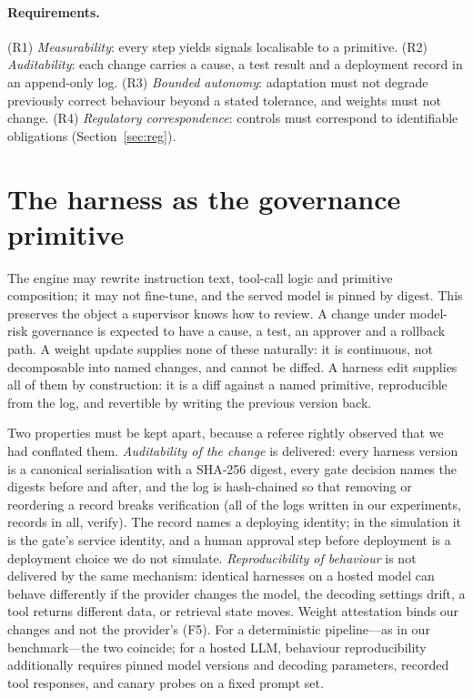 \documentclass[11pt]{article}
\begin{document}
\paragraph{Requirements.} (R1) \emph{Measurability}: every step yields signals localisable to a primitive. (R2) \emph{Auditability}: each change carries a cause, a test result and a deployment record in an append-only log. (R3) \emph{Bounded autonomy}: adaptation must not degrade previously correct behaviour beyond a stated tolerance, and weights must not change. (R4) \emph{Regulatory correspondence}: controls must correspond to identifiable obligations (Section~\ref{sec:reg}).

\section{The harness as the governance primitive}
\label{sec:harness}

The engine may rewrite instruction text, tool-call logic and primitive composition; it may not fine-tune, and the served model is pinned by digest. This preserves the object a supervisor knows how to review. A change under model-risk governance is expected to have a cause, a test, an approver and a rollback path. A weight update supplies none of these naturally: it is continuous, not decomposable into named changes, and cannot be diffed. A harness edit supplies all of them by construction: it is a diff against a named primitive, reproducible from the log, and revertible by writing the previous version back.

Two properties must be kept apart, because a referee rightly observed that we had conflated them. \emph{Auditability of the change} is delivered: every harness version is a canonical serialisation with a SHA-256 digest, every gate decision names the digests before and after, and the log is hash-chained so that removing or reordering a record breaks verification (all \nlogsok{} of the \nlogs{} logs written in our experiments, \nrecords{} records in all, verify). The record names a deploying identity; in the simulation it is the gate's service identity, and a human approval step before deployment is a deployment choice we do not simulate. \emph{Reproducibility of behaviour} is not delivered by the same mechanism: identical harnesses on a hosted model can behave differently if the provider changes the model, the decoding settings drift, a tool returns different data, or retrieval state moves. Weight attestation binds our changes and not the provider's (F5). For a deterministic pipeline---as in our benchmark---the two coincide; for a hosted LLM, behaviour reproducibility additionally requires pinned model versions and decoding parameters, recorded tool responses, and canary probes on a fixed prompt set.
\end{document}
